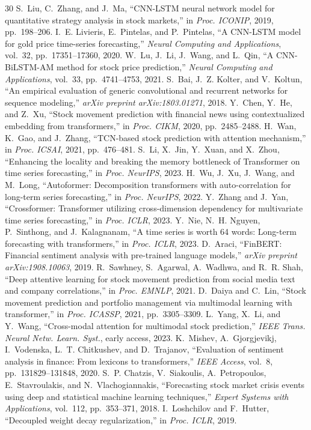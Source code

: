 \documentclass[conference]{IEEEtran}
\begin{document}
\begin{thebibliography}{30}
 S.~Liu, C.~Zhang, and J.~Ma, ``CNN-LSTM neural network model for quantitative strategy analysis in stock markets,'' in \textit{Proc. ICONIP}, 2019, pp.~198--206.
 I.~E. Livieris, E.~Pintelas, and P.~Pintelas, ``A CNN-LSTM model for gold price time-series forecasting,'' \textit{Neural Computing and Applications}, vol.~32, pp.~17351--17360, 2020.
 W.~Lu, J.~Li, J.~Wang, and L.~Qin, ``A CNN-BiLSTM-AM method for stock price prediction,'' \textit{Neural Computing and Applications}, vol.~33, pp.~4741--4753, 2021.
 S.~Bai, J.~Z. Kolter, and V.~Koltun, ``An empirical evaluation of generic convolutional and recurrent networks for sequence modeling,'' \textit{arXiv preprint arXiv:1803.01271}, 2018.
 Y.~Chen, Y.~He, and Z.~Xu, ``Stock movement prediction with financial news using contextualized embedding from transformers,'' in \textit{Proc. CIKM}, 2020, pp.~2485--2488.
 H.~Wan, K.~Gao, and J.~Zhang, ``TCN-based stock prediction with attention mechanism,'' in \textit{Proc. ICSAI}, 2021, pp.~476--481.
 S.~Li, X.~Jin, Y.~Xuan, and X.~Zhou, ``Enhancing the locality and breaking the memory bottleneck of Transformer on time series forecasting,'' in \textit{Proc. NeurIPS}, 2023.
 H.~Wu, J.~Xu, J.~Wang, and M.~Long, ``Autoformer: Decomposition transformers with auto-correlation for long-term series forecasting,'' in \textit{Proc. NeurIPS}, 2022.
 Y.~Zhang and J.~Yan, ``Crossformer: Transformer utilizing cross-dimension dependency for multivariate time series forecasting,'' in \textit{Proc. ICLR}, 2023.
 Y.~Nie, N.~H. Nguyen, P.~Sinthong, and J.~Kalagnanam, ``A time series is worth 64 words: Long-term forecasting with transformers,'' in \textit{Proc. ICLR}, 2023.
 D.~Araci, ``FinBERT: Financial sentiment analysis with pre-trained language models,'' \textit{arXiv preprint arXiv:1908.10063}, 2019.
 R.~Sawhney, S.~Agarwal, A.~Wadhwa, and R.~R. Shah, ``Deep attentive learning for stock movement prediction from social media text and company correlations,'' in \textit{Proc. EMNLP}, 2021.
 D.~Daiya and C.~Lin, ``Stock movement prediction and portfolio management via multimodal learning with transformer,'' in \textit{Proc. ICASSP}, 2021, pp.~3305--3309.
 L.~Yang, X.~Li, and Y.~Wang, ``Cross-modal attention for multimodal stock prediction,'' \textit{IEEE Trans. Neural Netw. Learn. Syst.}, early access, 2023.
 K.~Mishev, A.~Gjorgjevikj, I.~Vodenska, L.~T. Chitkushev, and D.~Trajanov, ``Evaluation of sentiment analysis in finance: From lexicons to transformers,'' \textit{IEEE Access}, vol.~8, pp.~131829--131848, 2020.
 S.~P. Chatzis, V.~Siakoulis, A.~Petropoulos, E.~Stavroulakis, and N.~Vlachogiannakis, ``Forecasting stock market crisis events using deep and statistical machine learning techniques,'' \textit{Expert Systems with Applications}, vol.~112, pp.~353--371, 2018.
 I.~Loshchilov and F.~Hutter, ``Decoupled weight decay regularization,'' in \textit{Proc. ICLR}, 2019.
\end{thebibliography}
\end{document}
